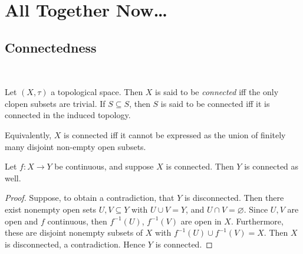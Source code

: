\documentclass{fkbook}
\begin{document}
  \section{All Together Now\ldots}
  \begin{adjustwidth}{1em}{1em}
  \subsection{Connectedness}~
  \begin{definition}
    Let $(X,\tau)$ a topological space. Then $X$ is said to be
    \emph{connected} iff the only clopen subsets are trivial. If $S
    \subseteq S$, then $S$ is said to be connected iff it is connected
    in the induced topology.

    Equivalently, $X$ is connected iff it cannot be expressed as the
    union of finitely many disjoint non-empty open subsets.
  \end{definition}
  \begin{theorem}
    Let $f : X \to Y$ be continuous, and suppose $X$ is connected.
    Then $Y$ is connected as well.
  \end{theorem}
  \begin{proof}
    Suppose, to obtain a contradiction, that $Y$ is disconnected. Then
    there exist nonempty open sets $U,V \subseteq Y$ with $U \cup V =
    Y$, and $U \cap V = \varnothing$. Since $U,V$ are open and $f$
    continuous, then $f^{-1}(U)$, $f^{-1}(V)$ are open in $X$.
    Furthermore, these are disjoint nonempty subsets of $X$ with
    $f^{-1}(U) \cup f^{-1}(V) = X$. Then $X$ is disconnected, a
    contradiction. Hence $Y$ is connected.
  \end{proof}
  \begin{theorem}

\end{theorem}
\end{adjustwidth}
\end{document}
